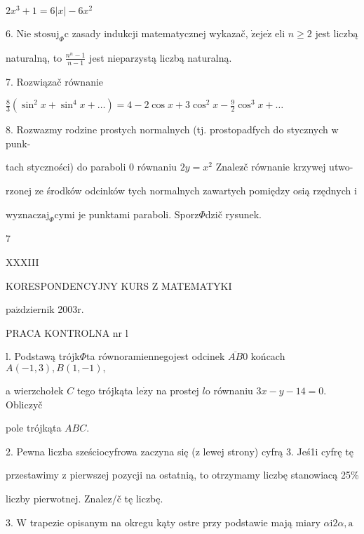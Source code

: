 \documentclass[a4paper,12pt]{article}
\begin{document}
$2x^{3}+1=6|x|-6x^{2}$

6. Nie $\mathrm{s}\mathrm{t}\mathrm{o}\mathrm{s}\mathrm{u}\mathrm{j}_{\Phi}\mathrm{c}$ zasady indukcji matematycznej wykazač, $\dot{\mathrm{z}}\mathrm{e}\mathrm{j}\mathrm{e}\dot{\mathrm{z}}$ eli $n \geq 2$ jest liczbą

naturalną, to $\displaystyle \frac{n^{n}-1}{n-1}$ jest nieparzystą liczbą naturalną.

7. Rozwiązač równanie

$\displaystyle \frac{8}{3}(\sin^{2}x+\sin^{4}x+\ldots)=4-2\cos x+3\cos^{2}x-\frac{9}{2}\cos^{3}x+\ldots$

8. Rozwazmy rodzine prostych normalnych (tj. prostopadfych do stycznych $\mathrm{w}$ punk-

tach styczności) do paraboli $0$ równaniu $2y=x^{2}$ Znalez$\acute{}$č równanie krzywej utwo-

rzonej ze środków odcinków tych normalnych zawartych pomiędzy osią rzędnych $\mathrm{i}$

$\mathrm{w}\mathrm{y}\mathrm{z}\mathrm{n}\mathrm{a}\mathrm{c}\mathrm{z}\mathrm{a}\mathrm{j}_{\Phi}$cymi je punktami paraboli. Sporz$\Phi$dzič rysunek.

7







XXXIII

KORESPONDENCYJNY KURS Z MATEMATYKI

$\mathrm{p}\mathrm{a}\acute{\mathrm{z}}$dziernik 2$003\mathrm{r}.$

PRACA KONTROLNA nr l

l. Podstawą trójk$\Phi$ta równoramiennegojest odcinek $\overline{AB}0$ końcach $A(-1,3), B(1,-1),$

a wierzchołek $C$ tego trójkąta $\mathrm{l}\mathrm{e}\dot{\mathrm{z}}\mathrm{y}$ na prostej $l\mathrm{o}$ równaniu $3x-y-14=0$. Obliczyč

pole trójkąta $ABC.$

2. Pewna liczba sześciocyfrowa zaczyna się ($\mathrm{z}$ lewej strony) cyfrą 3. Jeś1i cyfrę tę

przestawimy $\mathrm{z}$ pierwszej pozycji na ostatnią, to otrzymamy liczbę stanowiacą 25\%

liczby pierwotnej. Znalez/č tę liczbę.

3. $\mathrm{W}$ trapezie opisanym na okregu kąty ostre przy podstawie mają miary $\alpha \mathrm{i}2\alpha, \mathrm{a}$
\end{document}
